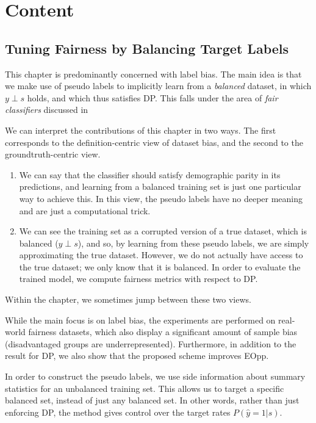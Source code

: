 \chapter{Content}\label{ch:content}
\section{Tuning Fairness by Balancing Target Labels}\label{sec:target-labels}
This chapter is predominantly concerned with label bias.
The main idea is that we make use of pseudo labels to implicitly learn from a \emph{balanced} dataset,
in which \(y\perp s\) holds, and which thus satisfies \acf{DP}.
This falls under the area of \emph{fair classifiers} discussed in 

We can interpret the contributions of this chapter in two ways.
The first corresponds to the definition-centric view of dataset bias,
and the second to the groundtruth-centric view.
\begin{enumerate}
  \item
    We can say that the classifier should satisfy demographic parity in its predictions,
    and learning from a balanced training set is just one particular way to achieve this.
    In this view, the pseudo labels have no deeper meaning and are just a computational trick.
  \item
    We can see the training set as a corrupted version of a true dataset, which is balanced (\(y\perp s\)),
    and so, by learning from these pseudo labels, we are simply approximating the true dataset.
    However, we do not actually have access to the true dataset; we only know that it is balanced.
    In order to evaluate the trained model, we compute fairness metrics with respect to \ac{DP}.
\end{enumerate}
Within the chapter, we sometimes jump between these two views.

While the main focus is on label bias,
the experiments are performed on real-world fairness datasets,
which also display a significant amount of sample bias (disadvantaged groups are underrepresented).
Furthermore, in addition to the result for \ac{DP}, we also show that the proposed scheme improves \acf{EOpp}.

In order to construct the pseudo labels,
we use side information about summary statistics for an unbalanced training set.
This allows us to target a specific balanced set, instead of just any balanced set.
In other words, rather than just enforcing \ac{DP}, the method gives control over the target rates \(P(\hat{y}=1|s)\).


